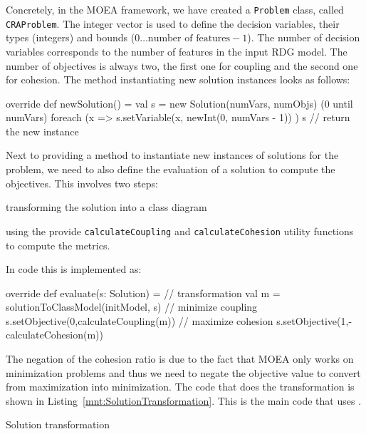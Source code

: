 \enlargethispage{5mm}

Concretely, in the MOEA framework, we have created a \texttt{Problem} class, called \texttt{CRAProblem}.
The integer vector is used to define the decision variables, their types (\Ie integers) and bounds (\Ie $0\dots\text{number of features}-1$).
The number of decision variables corresponds to the number of features in the input RDG model.
The number of objectives is always two, the first one for coupling and the second one for cohesion.
The method instantiating new solution instances looks as follows:
%
\begin{scalacode}
override def newSolution() = {
  val s = new Solution(numVars, numObjs)
  (0 until numVars) foreach (x => 
    s.setVariable(x, newInt(0, numVars - 1))
  )
  s // return the new instance
}
\end{scalacode}

Next to providing a method to instantiate new instances of solutions for the problem, we need to also define the evaluation of a solution to compute the objectives.
This involves two steps:
%
\begin{inparaenum}[(1)]
  \item transforming the solution into a class diagram
  \item using the provide \texttt{calculateCoupling} and \texttt{calculateCohesion} utility functions to compute the metrics.
\end{inparaenum}
%
In code this is implemented as:
%
\begin{scalacode}
override def evaluate(s: Solution) = {
  // transformation
  val m = solutionToClassModel(initModel, s)
  // minimize coupling
  s.setObjective(0,calculateCoupling(m))
  // maximize cohesion
  s.setObjective(1,-calculateCohesion(m))
}
\end{scalacode}
%
The negation of the cohesion ratio is due to the fact that MOEA only works on minimization problems and thus we need to negate the objective value to convert from maximization into minimization.
The code that does the transformation is shown in Listing~\ref{mnt:SolutionTransformation}.
This is the main code that uses \SIGMA.

\begin{listing}[!ht]
\caption{Solution transformation}
\label{mnt:SolutionTransformation}
\end{listing}

